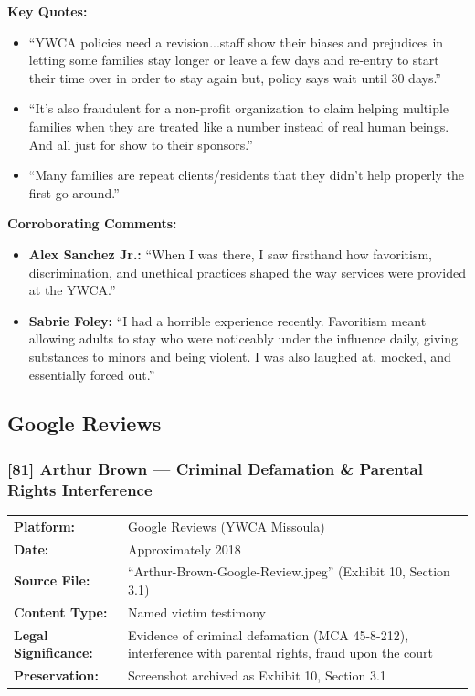 \documentclass[11pt,letterpaper]{article}
\newcommand{\citeref}[1]{\textbf{\color{NavyBlue}[#1]}}
\begin{document}
\vspace{0.1in}

\textbf{Key Quotes:}
\begin{itemize}[leftmargin=*]
\item ``YWCA policies need a revision...staff show their biases and prejudices in letting some families stay longer or leave a few days and re-entry to start their time over in order to stay again but, policy says wait until 30 days.''
\item ``It's also fraudulent for a non-profit organization to claim helping multiple families when they are treated like a number instead of real human beings. And all just for show to their sponsors.''
\item ``Many families are repeat clients/residents that they didn't help properly the first go around.''
\end{itemize}

\textbf{Corroborating Comments:}
\begin{itemize}[leftmargin=*]
\item \textbf{Alex Sanchez Jr.:} ``When I was there, I saw firsthand how favoritism, discrimination, and unethical practices shaped the way services were provided at the YWCA.''
\item \textbf{Sabrie Foley:} ``I had a horrible experience recently. Favoritism meant allowing adults to stay who were noticeably under the influence daily, giving substances to minors and being violent. I was also laughed at, mocked, and essentially forced out.''
\end{itemize}

\subsection{Google Reviews}

\subsubsection{\citeref{81} Arthur Brown --- Criminal Defamation \& Parental Rights Interference}

\begin{tabular}{@{}p{1.4in}p{4.6in}@{}}
\textbf{Platform:} & Google Reviews (YWCA Missoula)\\
\textbf{Date:} & Approximately 2018\\
\textbf{Source File:} & ``Arthur-Brown-Google-Review.jpeg'' (Exhibit 10, Section 3.1)\\
\textbf{Content Type:} & Named victim testimony\\
\textbf{Legal Significance:} & Evidence of criminal defamation (MCA 45-8-212), interference with parental rights, fraud upon the court\\
\textbf{Preservation:} & Screenshot archived as Exhibit 10, Section 3.1\\
\end{tabular}
\end{document}
